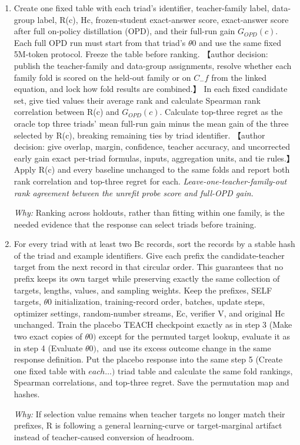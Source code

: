 \documentclass[10pt,a4paper]{article}
\begin{document}
\begin{enumerate}[leftmargin=*,start=5]
  \item Create one fixed table with each triad's identifier, teacher-family label, data-group label, R(c), Hc, frozen-student exact-answer score, exact-answer score after full on-policy distillation (OPD), and their full-run gain \(G_{OPD}(c).\) Each full OPD run must start from that triad's \(\theta 0\) and use the same fixed 5M-token protocol. Freeze the table before ranking. 【author decision: publish the teacher-family and data-group assignments, resolve whether each family fold is scored on the held-out family or on \(C_-f\) from the linked equation, and lock how fold results are combined.】 In each fixed candidate set, give tied values their average rank and calculate Spearman rank correlation between R(c) and \(G_{OPD}(c).\) Calculate top-three regret as the oracle top three triads' mean full-run gain minus the mean gain of the three selected by R(c), breaking remaining ties by triad identifier. 【author decision: give overlap, margin, confidence, teacher accuracy, and uncorrected early gain exact per-triad formulas, inputs, aggregation units, and tie rules.】 Apply R(c) and every baseline unchanged to the same folds and report both rank correlation and top-three regret for each.
\noindent\emph{Leave-one-teacher-family-out rank agreement between the unrefit probe score and full-OPD gain.}
\par{}
\par\emph{Why:} Ranking across holdouts, rather than fitting within one family, is the needed evidence that the response can select triads before training.
  \item For every triad with at least two Bc records, sort the records by a stable hash of the triad and example identifiers. Give each prefix the candidate-teacher target from the next record in that circular order. This guarantees that no prefix keeps its own target while preserving exactly the same collection of targets, lengths, values, and sampling weights. Keep the prefixes, SELF targets, \(\theta 0\) initialization, training-record order, batches, update steps, optimizer settings, random-number streams, Ec, verifier V, and original Hc unchanged. Train the placebo TEACH checkpoint exactly as in step 3 (Make two exact copies of \(\theta 0)\) except for the permuted target lookup, evaluate it as in step 4 (Evaluate \(\theta 0),\) and use its excess outcome change in the same response definition. Put the placebo response into the same step 5 (Create one fixed table with \(each\dots )\) triad table and calculate the same fold rankings, Spearman correlations, and top-three regret. Save the permutation map and hashes.
\par\emph{Why:} If selection value remains when teacher targets no longer match their prefixes, R is following a general learning-curve or target-marginal artifact instead of teacher-caused conversion of headroom.
\end{enumerate}
\end{document}
